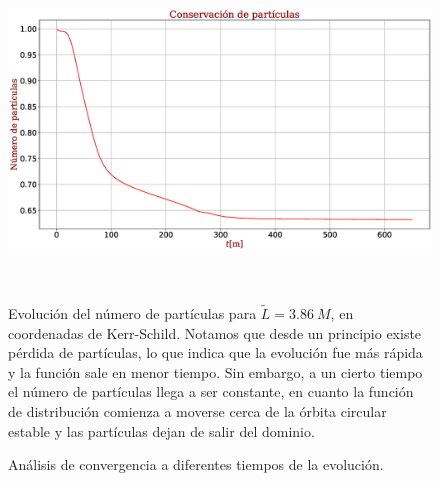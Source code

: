 \documentclass[11pt,twoside,openright,spanish]{report}
\numberwithin{equation}{chapter}
\numberwithin{figure}{chapter}
\numberwithin{table}{chapter}
\begin{document}
\begin{figure}[H]
	\centering
	\includegraphics[height=9cm]{graphs_study/LmayorKSGraphs/numpartKSMayor.eps}
	\caption{Evolución del número de partículas para $\tilde{L}=3.86\ M$, en coordenadas de Kerr-Schild. Notamos que desde un principio existe pérdida de partículas, lo que indica que la evolución fue más rápida y la función sale en menor tiempo. Sin embargo, a un cierto tiempo el número de partículas llega a ser constante, en cuanto la función de distribución comienza a moverse cerca de la órbita circular estable y las partículas dejan de salir del dominio.}
	\label{numpartKSMayor}
\end{figure}

\begin{figure}[H]
	\centering
	
	\caption{Análisis de convergencia a diferentes tiempos de la evolución.}
	\label{convergenceksLmayor}
\end{figure}
\end{document}

